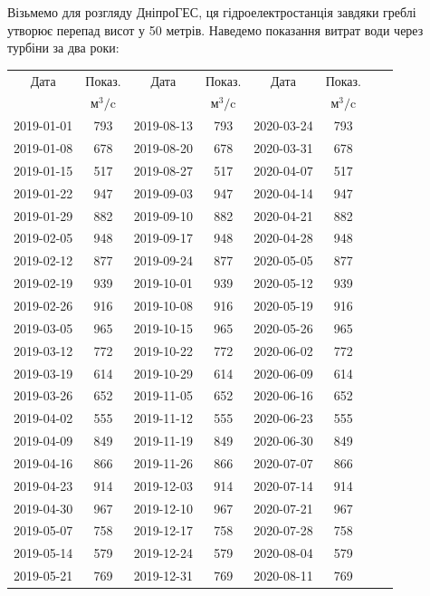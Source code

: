 \documentclass[12pt]{article}
\numberwithin{equation}{section}
\numberwithin{figure}{section}
\begin{document}
Візьмемо для розгляду ДніпроГЕС, ця гідроелектростанція завдяки греблі утворює перепад висот у 50 метрів. Наведемо показання витрат води через турбіни за два роки:\\

\begin{tabular}{|c|c||c|c||c|c||c|c|}\hline
Дата & Показ. & Дата & Показ. & Дата & Показ. \\
& $\text{м}^3/\text{c}$ && $\text{м}^3/\text{c}$ && $\text{м}^3/\text{c}$ \\\hline
2019-01-01 & 793 & 2019-08-13 & 793 & 2020-03-24 & 793 \\\hline
2019-01-08 & 678 & 2019-08-20 & 678 & 2020-03-31 & 678 \\\hline
2019-01-15 & 517 & 2019-08-27 & 517 & 2020-04-07 & 517 \\\hline
2019-01-22 & 947 & 2019-09-03 & 947 & 2020-04-14 & 947 \\\hline
2019-01-29 & 882 & 2019-09-10 & 882 & 2020-04-21 & 882 \\\hline
2019-02-05 & 948 & 2019-09-17 & 948 & 2020-04-28 & 948 \\\hline
2019-02-12 & 877 & 2019-09-24 & 877 & 2020-05-05 & 877 \\\hline
2019-02-19 & 939 & 2019-10-01 & 939 & 2020-05-12 & 939 \\\hline
2019-02-26 & 916 & 2019-10-08 & 916 & 2020-05-19 & 916 \\\hline
2019-03-05 & 965 & 2019-10-15 & 965 & 2020-05-26 & 965 \\\hline
2019-03-12 & 772 & 2019-10-22 & 772 & 2020-06-02 & 772 \\\hline
2019-03-19 & 614 & 2019-10-29 & 614 & 2020-06-09 & 614 \\\hline
2019-03-26 & 652 & 2019-11-05 & 652 & 2020-06-16 & 652 \\\hline
2019-04-02 & 555 & 2019-11-12 & 555 & 2020-06-23 & 555 \\\hline
2019-04-09 & 849 & 2019-11-19 & 849 & 2020-06-30 & 849 \\\hline
2019-04-16 & 866 & 2019-11-26 & 866 & 2020-07-07 & 866 \\\hline
2019-04-23 & 914 & 2019-12-03 & 914 & 2020-07-14 & 914 \\\hline
2019-04-30 & 967 & 2019-12-10 & 967 & 2020-07-21 & 967 \\\hline
2019-05-07 & 758 & 2019-12-17 & 758 & 2020-07-28 & 758 \\\hline
2019-05-14 & 579 & 2019-12-24 & 579 & 2020-08-04 & 579 \\\hline
2019-05-21 & 769 & 2019-12-31 & 769 & 2020-08-11 & 769 \\\hline
\end{tabular}
\end{document}
